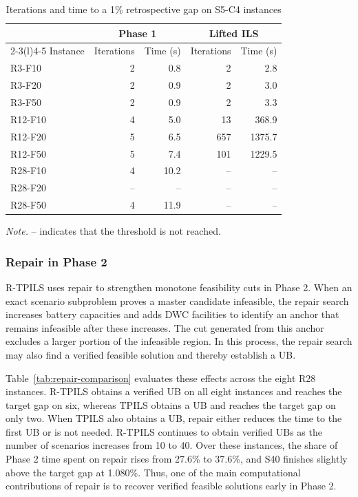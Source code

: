 \begin{table}[!htbp]
\centering
\small
\caption{Iterations and time to a 1\% retrospective gap on S5-C4 instances}
\label{tab:phase-one-grid}
\begin{tabular}{@{}lrrrr@{}}
\toprule
 & \multicolumn{2}{c}{Phase 1} & \multicolumn{2}{c}{Lifted ILS} \\
\cmidrule(lr){2-3}\cmidrule(l){4-5}
Instance & Iterations & Time (s) & Iterations & Time (s) \\
\midrule
R3-F10  & 2  & 0.8  & 2   & 2.8 \\
R3-F20  & 2  & 0.9  & 2   & 3.0 \\
R3-F50  & 2  & 0.9  & 2   & 3.3 \\
\midrule
R12-F10 & 4  & 5.0  & 13  & 368.9 \\
R12-F20 & 5  & 6.5  & 657 & 1375.7 \\
R12-F50 & 5  & 7.4  & 101 & 1229.5 \\
\midrule
R28-F10 & 4  & 10.2 & --  & -- \\
R28-F20 & -- & --   & --  & -- \\
R28-F50 & 4  & 11.9 & --  & -- \\
\bottomrule
\end{tabular}
\par\smallskip
\parbox{\linewidth}{\footnotesize\emph{Note.} -- indicates that the threshold is not reached.}
\end{table}

\subsubsection{Repair in Phase 2}
\label{subsec:phase-two-analysis}

R-TPILS uses repair to strengthen monotone feasibility cuts in Phase 2.
When an exact scenario subproblem proves a master candidate infeasible, the repair search increases battery capacities and adds DWC facilities to identify an anchor that remains infeasible after these increases.
The cut generated from this anchor excludes a larger portion of the infeasible region.
In this process, the repair search may also find a verified feasible solution and thereby establish a UB.

Table~\ref{tab:repair-comparison} evaluates these effects across the eight R28 instances.
R-TPILS obtains a verified UB on all eight instances and reaches the target gap on six, whereas TPILS obtains a UB and reaches the target gap on only two.
When TPILS also obtains a UB, repair either reduces the time to the first UB or is not needed.
R-TPILS continues to obtain verified UBs as the number of scenarios increases from 10 to 40.
Over these instances, the share of Phase 2 time spent on repair rises from 27.6\% to 37.6\%, and S40 finishes slightly above the target gap at 1.080\%.
Thus, one of the main computational contributions of repair is to recover verified feasible solutions early in Phase 2.

